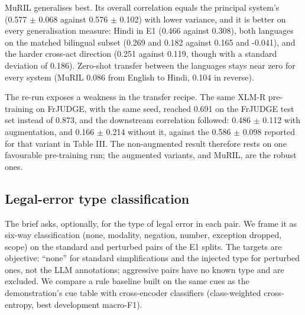 \documentclass[conference]{IEEEtran}
\begin{document}
MuRIL generalises best. Its overall correlation equals the principal system's (0.577 \ensuremath{\pm} 0.068 against 0.576 \ensuremath{\pm} 0.102) with lower variance, and it is better on every generalisation measure: Hindi in E1 (0.466 against 0.308), both languages on the matched bilingual subset (0.269 and 0.182 against 0.165 and -0.041), and the harder cross-act direction (0.251 against 0.119, though with a standard deviation of 0.186). Zero-shot transfer between the languages stays near zero for every system (MuRIL 0.086 from English to Hindi, 0.104 in reverse).

The re-run exposes a weakness in the transfer recipe. The same XLM-R pre-training on FrJUDGE, with the same seed, reached 0.691 on the FrJUDGE test set instead of 0.873, and the downstream correlation followed: 0.486 \ensuremath{\pm} 0.112 with augmentation, and 0.166 \ensuremath{\pm} 0.214 without it, against the 0.586 \ensuremath{\pm} 0.098 reported for that variant in Table III. The non-augmented result therefore rests on one favourable pre-training run; the augmented variants, and MuRIL, are the robust ones.

\subsection{Legal-error type classification}

The brief asks, optionally, for the type of legal error in each pair. We frame it as six-way classification (none, modality, negation, number, exception dropped, scope) on the standard and perturbed pairs of the E1 splits. The targets are objective: “none” for standard simplifications and the injected type for perturbed ones, not the LLM annotations; aggressive pairs have no known type and are excluded. We compare a rule baseline built on the same cues as the demonstration's cue table with cross-encoder classifiers (class-weighted cross-entropy, best development macro-F1).
\end{document}
